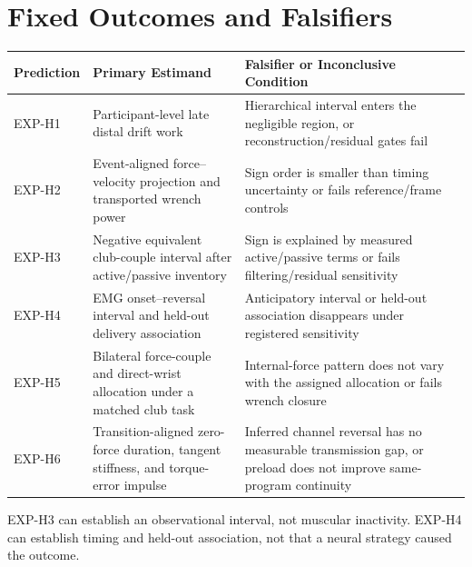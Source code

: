 \documentclass[
  letterpaper,
]{report}
\begin{document}
\section{Fixed Outcomes and
Falsifiers}\label{fixed-outcomes-and-falsifiers}

\begin{longtable}[]{@{}
  >{\raggedright\arraybackslash}p{}
  >{\raggedright\arraybackslash}p{}
  >{\raggedright\arraybackslash}p{}@{}}
\toprule\noalign{}
\begin{minipage}[b]{\linewidth}\raggedright
Prediction
\end{minipage} & \begin{minipage}[b]{\linewidth}\raggedright
Primary Estimand
\end{minipage} & \begin{minipage}[b]{\linewidth}\raggedright
Falsifier or Inconclusive Condition
\end{minipage} \\
\midrule\noalign{}
\endhead
\bottomrule\noalign{}
\endlastfoot
EXP-H1 & Participant-level late distal drift work & Hierarchical
interval enters the negligible region, or reconstruction/residual gates
fail \\
EXP-H2 & Event-aligned force--velocity projection and transported wrench
power & Sign order is smaller than timing uncertainty or fails
reference/frame controls \\
EXP-H3 & Negative equivalent club-couple interval after active/passive
inventory & Sign is explained by measured active/passive terms or fails
filtering/residual sensitivity \\
EXP-H4 & EMG onset--reversal interval and held-out delivery association
& Anticipatory interval or held-out association disappears under
registered sensitivity \\
EXP-H5 & Bilateral force-couple and direct-wrist allocation under a
matched club task & Internal-force pattern does not vary with the
assigned allocation or fails wrench closure \\
EXP-H6 & Transition-aligned zero-force duration, tangent stiffness, and
torque-error impulse & Inferred channel reversal has no measurable
transmission gap, or preload does not improve same-program continuity \\
\end{longtable}

EXP-H3 can establish an observational interval, not muscular inactivity.
EXP-H4 can establish timing and held-out association, not that a neural
strategy caused the outcome.
\end{document}
